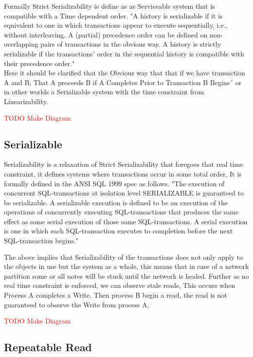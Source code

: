 \documentclass[a4paper,10pt,titlepage]{report}
\begin{document}
Formally Strict Serializability is define as as Serviceable system that is compatible with a Time dependent order.
"A history is serializable if it is equivalent to one in which transactions appear to execute sequentially, i.e., without interleaving. A (partial) precedence order can be defined on non-overlapping pairs of transactions in the obvious way. A history is strictly serializable if the transactions’ order in the sequential history is compatible with their precedence order."\cite{10.1145/78969.78972}\\
\vspace{5mm}
Here it should be clarified that the Obvious way that that if we have transaction A and B, That A proceeds B if A Completes Prior to Transaction B Begins´ or in other worlds a Serializable system with the time constraint from Linearizability.

\textcolor{red}{TODO Make Diagram}
\subsection{Serializable}

Serializability is a relaxation of Strict Serializability that foregoes that real time constraint, it defines systems where transactions occur in some total order, It is formally defined in the ANSI SQL 1999 spec as follows. "The execution of concurrent SQL-transactions at isolation level SERIALIZABLE is guaranteed to be serializable. A serializable execution is defined to be an execution of the operations of concurrently executing SQL-transactions that produces the same effect as some serial execution of those same SQL-transactions. A serial execution is one in which each SQL-transaction executes to completion before the next SQL-transaction begins."\cite{ansisql1999}\\
\vspace{5mm}

The above implies that Serializability of the transactions does not only apply to the objects in use but the system as a whole, this means that in case of a network partition some or all notes will be stuck until the network is healed. Further as no real time constraint is enforced,  we can observe stale reads, This occurs when Process A completes a Write, Then process B begin a read, the read is not guaranteed to observe the Write from process A, 

\textcolor{red}{TODO Make Diagram}

\subsection{Repeatable Read}
\end{document}
